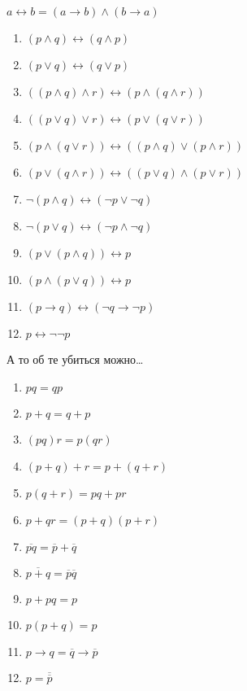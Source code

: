 \begin{definition} $a \leftrightarrow b = (a \to b) \land (b \to  a)$ \end{definition}

\begin{example} \thmslashn

    \begin{enumerate}
        \item $(p \land q) \leftrightarrow (q \land p)$
        \item $(p \lor q) \leftrightarrow (q \lor p)$
        \item $((p \land q) \land r) \leftrightarrow (p \land (q \land r))$
        \item $((p \lor q) \lor r) \leftrightarrow (p \lor (q \lor r))$
        \item $(p \land (q \lor r)) \leftrightarrow ((p \land q) \lor (p \land r))$
        \item $(p \lor (q \land r)) \leftrightarrow ((p \lor q) \land (p \lor r))$
        \item $\neg(p \land q) \leftrightarrow (\neg p \lor \neg q)$
        \item $\neg(p\lor q) \leftrightarrow (\neg p \land \neg q)$
        \item $(p \lor (p \land q)) \leftrightarrow p$
        \item $(p \land (p \lor q)) \leftrightarrow p$
        \item $(p \to q) \leftrightarrow (\neg q \to \neg p)$
        \item $p \leftrightarrow \neg\neg p$
    \end{enumerate}
\end{example}

\begin{example} \thmslashn

    А то об те убиться можно\ldots

    \begin{enumerate}
        \item $pq = qp$
        \item $p+q = q+p$
        \item $(pq)r = p(qr)$
        \item $(p+q)+r = p+(q+r)$
        \item $p(q+r) = pq+pr$
        \item $p+qr = (p+q)(p+r)$
        \item $\overline{pq} = \overline{p} + \overline{q}$ 
        \item $\overline{p + q} = \overline{p}\overline{q}$ 
        \item $p + pq = p$
        \item $p(p+q) = p$
        \item $p \to q = \overline{q} \to \overline{p}$ 
        \item $p = \overline{\overline{p}}$
    \end{enumerate}
\end{example}

